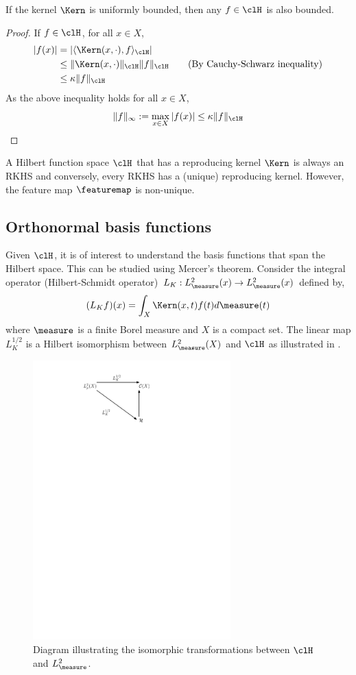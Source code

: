 \begin{proposition}
\label{prop:RKHS_bounded}
	If the kernel $\Kern$ is uniformly bounded, then any $f \in \clH$ is also bounded. 
\end{proposition}
\begin{proof}
	If $f \in \clH$, for all $x \in X$,
	\[
	\begin{aligned}
	|f(x)| &= |\langle \Kern(x,\cdot), f \rangle_\clH| \\
	& \leq \|\Kern(x,\cdot)\|_\clH \|f\|_\clH \qquad{\text{(By Cauchy-Schwarz inequality)}}\\ 
	& \leq \kappa \|f\|_\clH
	\end{aligned}
	\]
	As the above inequality holds for all $x \in X$, 
	\[
	\|f\|_\infty := \max_{x\in X}|f(x)| \leq \kappa \|f\|_\clH
	\]
\end{proof}
A Hilbert function space $\clH$ that has a reproducing kernel $\Kern$ is always an RKHS and conversely, every RKHS has a (unique) reproducing kernel. However, the feature map $\featuremap$ is non-unique. 
\subsection{Orthonormal basis functions} 
Given $\clH$, it is of interest to understand the basis functions that span the Hilbert space. This can be studied using Mercer's theorem. 
Consider the integral operator (Hilbert-Schmidt operator) $L_K:L^2_\measure(x) \to L^2_\measure(x)$ defined by,
\[
(L_K f)(x) = \int_X \Kern(x,t) f(t) d\measure(t)
\]
where $\measure$ is a finite Borel measure and $X$ is a compact set.
The linear map $L_K^{1/2}$ is a Hilbert isomorphism between $L^2_{\measure}(X)$ and $\clH$ as illustrated in . 

\begin{figure}[htbp]
	\centering
	\includegraphics[width=3in]{images/Chap3_RKHS_isomorphism}
	\caption{Diagram illustrating the isomorphic transformations between $\clH$ and $L^2_\measure$.}
	\label{fig:rkhs_isomorphism}
\end{figure}

